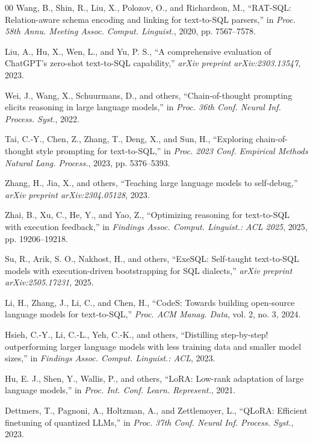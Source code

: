 \documentclass[conference]{IEEEtran}
\begin{document}
\begin{thebibliography}{00}
 Wang, B., Shin, R., Liu, X., Polozov, O., and Richardson, M., ``RAT-SQL: Relation-aware schema encoding and linking for text-to-SQL parsers,'' in \textit{Proc. 58th Annu. Meeting Assoc. Comput. Linguist.}, 2020, pp. 7567--7578.

 Liu, A., Hu, X., Wen, L., and Yu, P. S., ``A comprehensive evaluation of ChatGPT's zero-shot text-to-SQL capability,'' \textit{arXiv preprint arXiv:2303.13547}, 2023.

 Wei, J., Wang, X., Schuurmans, D., and others, ``Chain-of-thought prompting elicits reasoning in large language models,'' in \textit{Proc. 36th Conf. Neural Inf. Process. Syst.}, 2022.

 Tai, C.-Y., Chen, Z., Zhang, T., Deng, X., and Sun, H., ``Exploring chain-of-thought style prompting for text-to-SQL,'' in \textit{Proc. 2023 Conf. Empirical Methods Natural Lang. Process.}, 2023, pp. 5376--5393.

 Zhang, H., Jia, X., and others, ``Teaching large language models to self-debug,'' \textit{arXiv preprint arXiv:2304.05128}, 2023.

 Zhai, B., Xu, C., He, Y., and Yao, Z., ``Optimizing reasoning for text-to-SQL with execution feedback,'' in \textit{Findings Assoc. Comput. Linguist.: ACL 2025}, 2025, pp. 19206--19218.

 Su, R., Arik, S. O., Nakhost, H., and others, ``ExeSQL: Self-taught text-to-SQL models with execution-driven bootstrapping for SQL dialects,'' \textit{arXiv preprint arXiv:2505.17231}, 2025.

 Li, H., Zhang, J., Li, C., and Chen, H., ``CodeS: Towards building open-source language models for text-to-SQL,'' \textit{Proc. ACM Manag. Data}, vol. 2, no. 3, 2024.

 Hsieh, C.-Y., Li, C.-L., Yeh, C.-K., and others, ``Distilling step-by-step! outperforming larger language models with less training data and smaller model sizes,'' in \textit{Findings Assoc. Comput. Linguist.: ACL}, 2023.

 Hu, E. J., Shen, Y., Wallis, P., and others, ``LoRA: Low-rank adaptation of large language models,'' in \textit{Proc. Int. Conf. Learn. Represent.}, 2021.

 Dettmers, T., Pagnoni, A., Holtzman, A., and Zettlemoyer, L., ``QLoRA: Efficient finetuning of quantized LLMs,'' in \textit{Proc. 37th Conf. Neural Inf. Process. Syst.}, 2023.


\end{thebibliography}
\end{document}
